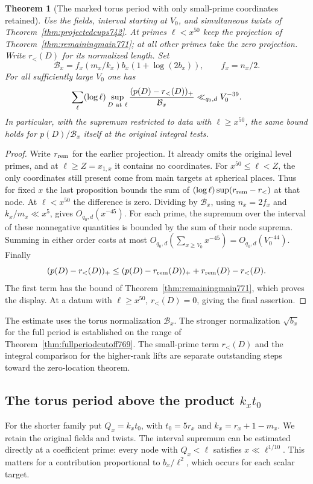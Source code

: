 \documentclass[a4paper,11pt]{article}
\newtheorem{theorem}[proposition]{Theorem}
\theoremstyle{definition}
\theoremstyle{remark}
\numberwithin{equation}{section}
\begin{document}
\begin{theorem}[The marked torus period with only small-prime coordinates retained]
\leavevmode\label{thm:smallcoords777}
Use the fields, interval starting at \(V_0\), and
simultaneous twists of Theorem~\ref{thm:projectedcups742}.
At primes \(\ell<x^{50}\) keep the projection of
Theorem~\ref{thm:remainingmain771}; at all other primes
take the zero projection. Write \(r_{<}(D)\) for its
normalized length. Set
\[
     \mathcal B_x=f_x(m_x/k_x)b_x(1+\log(2b_x)),
                \qquad f_x=n_x/2 .
\]
For all sufficiently large \(V_0\) one has
\[
 \sum_\ell(\log\ell)\sup_{D\ {\rm at}\ \ell}
          \frac{(p(D)-r_{<}(D))_+}{\mathcal B_x}
             \ll_{q_0,d} V_0^{-39}.
\]
In particular, with the supremum restricted to data with
\(\ell\ge x^{50}\), the same bound holds for
\(p(D)/\mathcal B_x\) itself at the original integral tests.
\end{theorem}
\begin{proof}
Write \(r_{\rm rem}\) for the earlier projection. It
already omits the original level primes, and at
\(\ell\ge Z=x_{1,x}\) it contains no coordinates.
For \(x^{50}\le\ell<Z\), the only coordinates still
present come from main targets at spherical places.
Thus for fixed \(x\) the last proposition bounds the sum
of \((\log\ell)\sup(r_{\rm rem}-r_{<})\) at that node.
At \(\ell<x^{50}\) the difference is zero.
Dividing by \(\mathcal B_x\), using \(n_x=2f_x\) and
\(k_x/m_x\ll x^5\), gives \(O_{q_0,d}(x^{-45})\).
For each prime, the supremum over the interval of these
nonnegative quantities is bounded by the sum of their
node suprema. Summing in either order costs at most
\(O_{q_0,d}(\sum_{x\ge V_0}x^{-45})=O_{q_0,d}(V_0^{-44})\).
Finally
\[
 (p(D)-r_{<}(D))_+
 \le (p(D)-r_{\rm rem}(D))_++r_{\rm rem}(D)-r_{<}(D).
\]
The first term has the bound of
Theorem~\ref{thm:remainingmain771}, which proves the
display. At a datum with \(\ell\ge x^{50}\), \(r_{<}(D)=0\),
giving the final assertion.
\end{proof}
The estimate uses the torus normalization \(\mathcal B_x\).
The stronger normalization \(\sqrt{b_x}\) for the full
period is established on the range of
Theorem~\ref{thm:fullperiodcutoff769}. The small-prime
term \(r_{<}(D)\) and the integral comparison for the
higher-rank lifts are separate outstanding steps toward
the zero-location theorem.
\clearpage

\subsection{The torus period above the product \(k_x t_0\)}
\label{sec:rankcutoff778}
For the shorter family put \(Q_x=k_x t_0\), with
\(t_0=5r_x\) and \(k_x=r_x+1-m_x\). We retain the
original fields and twists. The interval supremum can
be estimated directly at a coefficient prime: every
node with \(Q_x<\ell\) satisfies \(x\ll\ell^{1/10}\).
This matters for a contribution proportional to
\(b_x/\ell^2\), which occurs for each scalar target.
\end{document}
